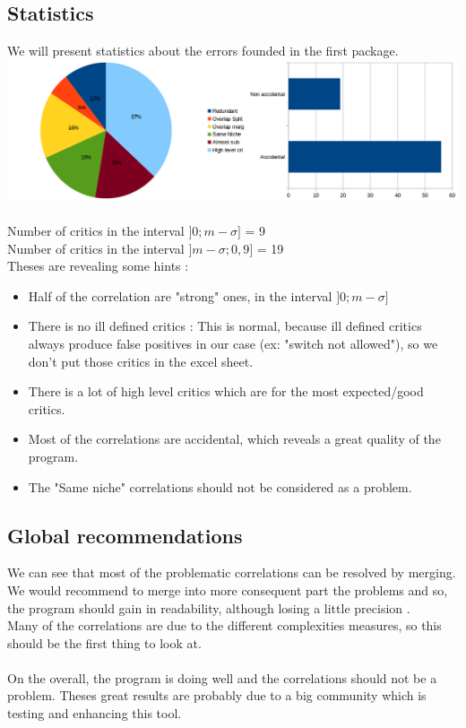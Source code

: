 \documentclass{article}
\begin{document}
\subsection{Statistics}
We will present statistics about the errors founded in the first package. \\
\includegraphics[scale=0.4]{statsmm.png} \\ \\
Number of critics in the interval $]0 ; m-\sigma]$ = 9 \\
Number of critics in the interval $]m-\sigma;0,9]$ = 19 \\

Theses are revealing some hints :
\begin{itemize}
\item Half of the correlation are "strong" ones, in the interval $]0 ; m-\sigma]$

\item There is no ill defined critics : This is normal, because ill defined critics always produce false positives in our case (ex: "switch not allowed"), so we don't put those critics in the excel sheet.

\item There is a lot of high level critics which are for the most expected/good critics.

\item Most of the correlations are accidental, which reveals a great quality of the program.

\item The "Same niche" correlations should not be considered as a problem. 


\end{itemize}

\subsection{Global recommendations}
We can see that most of the problematic correlations can be resolved by merging. \\We would recommend to merge into more consequent part the problems and so, the program should gain in readability, although losing a little precision . \\ Many of the correlations are due to the different complexities measures, so this should be the first thing to look at.\\ \\
On the overall, the program is doing well and the correlations should not be a problem. Theses great results are probably due to a big community which is testing and enhancing this tool.
\end{document}

